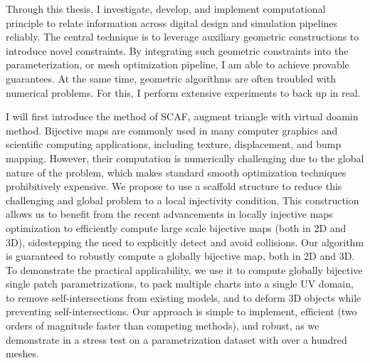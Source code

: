 
Through this thesis, I investigate, develop, and implement computational principle to relate information across digital design and simulation pipelines reliably. 
The central technique is to leverage auxiliary geometric constructions to introduce novel constraints. 
By integrating such geometric constraints into the parameterization, or mesh optimization pipeline,  I am able to achieve provable guarantees. 
At the same time, geometric algorithms are often troubled with numerical problems. For this, I perform extensive experiments to back up in real.

I will first introduce the method of SCAF, 
augment triangle with virtual doamin method.
Bijective maps are commonly used in many computer graphics and scientific computing applications, including texture, displacement, and bump mapping. However, their computation is numerically challenging due to the global nature of the problem, which makes standard smooth optimization techniques prohibitively expensive.
We propose to use a scaffold structure to reduce this challenging and global problem to a local injectivity condition. This construction allows us to benefit from the recent advancements in locally injective maps optimization to efficiently compute large scale bijective maps (both in 2D and 3D), sidestepping the need to explicitly detect and avoid collisions.
Our algorithm is guaranteed to robustly compute a globally bijective map, both in 2D and 3D. To demonstrate the practical applicability, we use it to compute globally bijective single patch parametrizations, to pack multiple charts into a single UV domain, to remove self-intersections from existing models, and to deform 3D objects while preventing self-intersections.
Our approach is simple to implement, efficient (two orders of magnitude faster than competing methods), and robust, as we demonstrate in a stress test on a parametrization dataset with over a hundred meshes.

